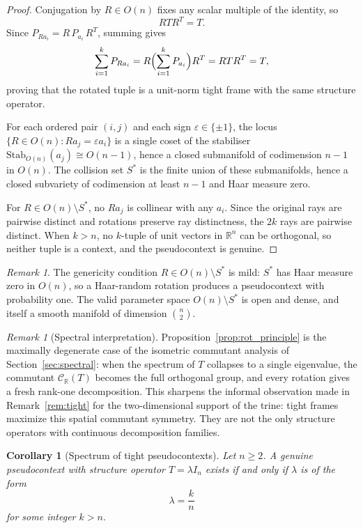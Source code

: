 \documentclass[
  twocolumn,
  aps,
  pra,
  floatfix,
  amsmath,amssymb,
  longbibliography
]{revtex4-2}
\newtheorem{corollary}[theorem]{Corollary}
\theoremstyle{definition}
\theoremstyle{remark}
\newtheorem{remark}[theorem]{Remark}
\begin{document}
\begin{proof}
Conjugation by \(R\in O(n)\) fixes any scalar multiple of the identity, so
\[
R T R^T=T.
\]
Since $P_{Ra_i}=R\,P_{a_i}\,R^{T}$, summing gives
\[
\sum_{i=1}^{k} P_{Ra_i}
=
R\Bigl(\sum_{i=1}^{k} P_{a_i}\Bigr)R^T
=
RTR^T
=
T,
\]
proving that the rotated tuple is a unit-norm tight frame with the same structure operator.

For each ordered pair $(i,j)$ and each sign $\varepsilon\in\{\pm1\}$,
the locus $\{R\in O(n):Ra_j=\varepsilon a_i\}$ is a single coset of
the stabiliser $\mathrm{Stab}_{O(n)}(a_j)\cong O(n-1)$, hence a
closed submanifold of codimension $n-1$ in $O(n)$.  The collision
set $S^{*}$ is the finite union of these submanifolds, hence a
closed subvariety of codimension at least $n-1$ and Haar measure
zero.

For $R\in O(n)\setminus S^{*}$, no $Ra_j$ is collinear with any
$a_i$.  Since the original rays are pairwise distinct and rotations
preserve ray distinctness, the $2k$ rays are pairwise distinct.  When $k>n$, no
$k$-tuple of unit vectors in $\mathbb{R}^n$ can be orthogonal, so
neither tuple is a context, and the pseudocontext is genuine.
\end{proof}

\begin{remark}
The genericity condition $R\in O(n)\setminus S^{*}$ is mild: $S^{*}$
has Haar measure zero in $O(n)$, so a Haar-random rotation produces
a pseudocontext with probability one.  The valid parameter space
$O(n)\setminus S^{*}$ is open and dense, and itself a smooth
manifold of dimension $\binom{n}{2}$.
\end{remark}

\begin{remark}[Spectral interpretation]\label{rem:spectral_rot}
Proposition~\ref{prop:rot_principle} is the maximally degenerate
case of the isometric commutant analysis of
Section~\ref{sec:spectral}: when the spectrum of $T$ collapses to a
single eigenvalue, the commutant $\mathcal{C}_{\mathbb{R}}(T)$ becomes the full
orthogonal group, and every rotation gives a fresh rank-one
decomposition.  This sharpens the informal observation made in
Remark~\ref{rem:tight} for the two-dimensional support of the trine:
tight frames maximize this spatial commutant symmetry.  They are not the
only structure operators with continuous decomposition families.
\end{remark}

\begin{corollary}[Spectrum of tight pseudocontexts]
\label{cor:tight_spectrum}
Let $n \ge 2$. A genuine pseudocontext with structure operator
$T = \lambda I_n$ exists if and only if $\lambda$ is of the form
\[
\lambda = \frac{k}{n}
\]
for some integer $k > n$.
\end{corollary}
\end{document}
